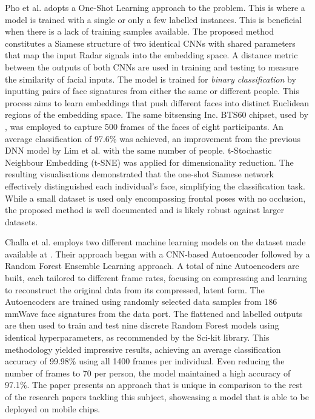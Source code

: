 \documentclass{interim}
\begin{document}
Pho et al. \cite{pho2021radar} adopts a One-Shot Learning approach to the problem. This is where a model is trained with a single or only a few labelled instances. This is beneficial when there is a lack of training samples available. The proposed method constitutes a Siamese structure of two identical CNNs with shared parameters that map the input Radar signals into the embedding space. A distance metric between the outputs of both CNNs are used in training and testing to measure the similarity of facial inputs. The model is trained for \textit{binary classification} by inputting pairs of face signatures from either the same or different people. This process aims to learn embeddings that push different faces into distinct Euclidean regions of the embedding space. The same bitsensing Inc. BTS60 chipset, used by \cite{lim2020dnn, kim2020face}, was employed to capture 500 frames of the faces of eight participants. An average classification of 97.6\% was achieved, an improvement from the previous DNN model by Lim et al. \cite{lim2020dnn} with the same number of people. t-Stochastic Neighbour Embedding (t-SNE) \cite{van2008visualizing} was applied for dimensionality reduction. The resulting visualisations demonstrated that the one-shot Siamese network effectively distinguished each individual's face, simplifying the classification task. While a small dataset is used only encompassing frontal poses with no occlusion, the proposed method is well documented and is likely robust against larger datasets.

Challa et al. \cite{challa2021face} employs two different machine learning models on the dataset made available at \cite{mmwavefacedata}. Their approach began with a CNN-based Autoencoder followed by a Random Forest Ensemble Learning approach. A total of nine Autoencoders are built, each tailored to different frame rates, focusing on compressing and learning to reconstruct the original data from its compressed, latent form. The Autoencoders are trained using randomly selected data samples from 186 mmWave face signatures from the data port. The flattened and labelled outputs are then used to train and test nine discrete Random Forest models using identical hyperparameters, as recommended by the Sci-kit library. This methodology yielded impressive results, achieving an average classification accuracy of 99.98\% using all 1400 frames per individual. Even reducing the number of frames to 70 per person, the model maintained a high accuracy of 97.1\%. The paper presents an approach that is unique in comparison to the rest of the research papers tackling this subject, showcasing a model that is able to be deployed on mobile chips.
\end{document}
